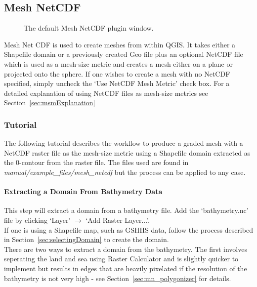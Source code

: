 \subsection{Mesh NetCDF}
\label{sec:meshNetCDF}
\begin{figure}[h!]
  \centering
  \caption{The default Mesh NetCDF plugin window.}
  \label{fig:mn_window}
\end{figure}

Mesh Net CDF is used to create meshes from within QGIS. It takes either a Shapefile domain or a previously created Geo file plus an optional NetCDF file which is used as a mesh-size metric and creates a mesh either on a plane or projected onto the sphere. If one wishes to create a mesh with no NetCDF specified, simply uncheck the `Use NetCDF Mesh Metric' check box. For a detailed explanation of using NetCDF files as mesh-size metrics see Section~\ref{sec:msmExplanation} \\

\subsubsection{Tutorial}
The following tutorial describes the workflow to produce a graded mesh with a NetCDF raster file as the mesh-size metric using a Shapefile domain extracted as the 0-contour from the raster file. The files used are found in \emph{manual/example\_files/mesh\_netcdf} but the process can be applied to any case.

\paragraph{Extracting a Domain From Bathymetry Data\\}
\label{sec:createDomain}
This step will extract a domain from a bathymetry file. Add the `bathymetry.nc' file by clicking `Layer' $\rightarrow$ `Add Raster Layer...'. \\

If one is using a Shapefile map, such as GSHHS data, follow the process described in Section~\ref{sec:selectingDomain} to create the domain. \\

There are two ways to extract a domain from the bathymetry. The first involves seperating the land and sea using Raster Calculator and is slightly quicker to implement but results in edges that are heavily pixelated if the resolution of the bathymetry is not very high - see Section~\ref{sec:mn_polygonizer} for details. \\

